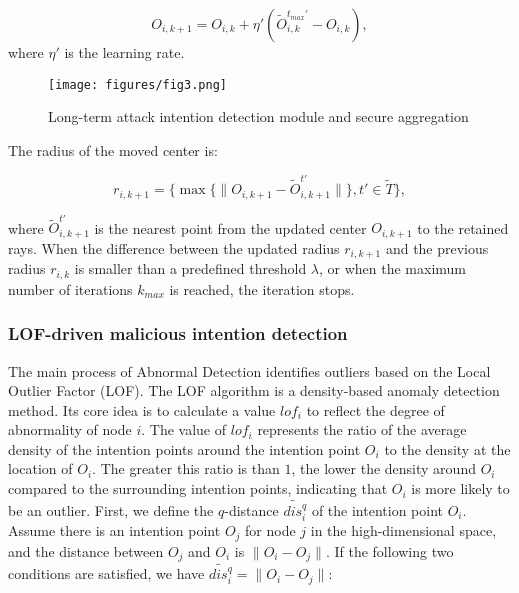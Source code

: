\documentclass[lettersize,journal]{IEEEtran}
\begin{document}
\begin{equation}
O_{i,k+1} = O_{i,k} + \eta' (\tilde{O}_{i,k}^{t_{max}'}-O_{i,k}),
\end{equation}
where $\eta'$ is the learning rate. 

\begin{figure}[!ht]
    \centering
    \texttt{[image: figures/fig3.png]}
    \caption{Long-term attack intention detection module and secure aggregation}
    \label{fig3:longterm}
\end{figure}

The radius of the moved center is:

\begin{equation}
r_{i,k+1} =  \{ \max\{\| O_{i,k+1}-\tilde O_{i,k+1}^{t'} \|\}, t'\in \tilde T\} ,
\end{equation}



where $\tilde O_{i,k+1}^{t'}$ is the nearest point from the updated center $O_{i,k+1}$ to the retained rays. When the difference between the updated radius \( r_{i,k+1} \) and the previous radius \( r_{i,k} \) is smaller than a predefined threshold \( \lambda \), or when the maximum number of iterations $k_{max}$ is reached, the iteration stops.

\subsubsection{LOF-driven malicious intention detection}
The main process of Abnormal Detection identifies outliers based on the Local Outlier Factor (LOF). The LOF algorithm is a density-based anomaly detection method. Its core idea is to calculate a value $lof_i$ to reflect the degree of abnormality of node $i$. The value of $lof_i$ represents the ratio of the average density of the intention points around the intention point $O_i$ to the density at the location of $O_i$. The greater this ratio is than $1$, the lower the density around $O_i$ compared to the surrounding intention points, indicating that $O_i$ is more likely to be an outlier. First, we define the $q$-distance $\widetilde{dis_i^q}$ of the intention point $O_i$. Assume there is an intention point $O_j$ for node $j$ in the high-dimensional space, and the distance between $O_j$ and $O_i$ is $\|O_i-O_j\|$. If the following two conditions are satisfied, we have $\widetilde{dis_i^q} = \|O_i-O_j\|$:
\end{document}
